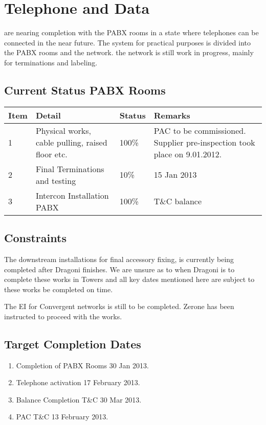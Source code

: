 
\chapter{Telephone and Data}

 are nearing completion with the PABX rooms in a state where telephones
can be connected in the near future. The system for practical
purposes is divided into the PABX rooms and the network. the network is still work in progress, mainly for terminations and
labeling. 


\section{Current Status PABX Rooms}

\begin{table}[h]
\RaggedRight
\begin{tabular}{lp{3.5cm}lp{3.5cm}}
\toprule
Item & Detail & Status & Remarks\\
\midrule
1    & Physical works, cable pulling, raised floor etc.
     & 100\% & PAC to be commissioned. Supplier pre-inspection took place on 9.01.2012.\\
2    & Final Terminations and testing & 10\% & 15 Jan 2013\\
3    & Intercon Installation PABX      & 100\% & T\&C balance\\ 
\bottomrule
\end{tabular}
\end{table}

\section{Constraints}

The downstream installations for final accessory fixing, is currently being completed after Dragoni finishes. We are unsure as to when Dragoni is to complete these works in Towers and all key dates mentioned here are subject to these works be completed on time.

The EI for Convergent networks is still to be completed. Zerone has been instructed to proceed with the works.

\section{Target Completion Dates}

\begin{enumerate}
\item  Completion of PABX Rooms 30 Jan 2013.
\item  Telephone activation 17 February 2013.
\item  Balance Completion T\&C  30 Mar 2013.
\item  PAC T\&C  13 February 2013.          
\end{enumerate}


 








